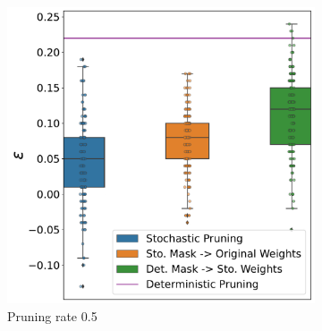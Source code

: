 

\begin{figure}[!htb]
  \centering
     \begin{subfigure}[b]{0.65\columnwidth}
         \centering
    \includegraphics[width=\columnwidth]{figures/epsilon_allN_all_pr_0.5_sigma=0.001.pdf}
    \caption{ Pruning rate 0.5} 
    \label{fig:pr0.5sigma0.001}
     \end{subfigure}
     \hfill
     \begin{subfigure}[b]{0.65\columnwidth}
         \centering

\end{subfigure}
\end{figure}
